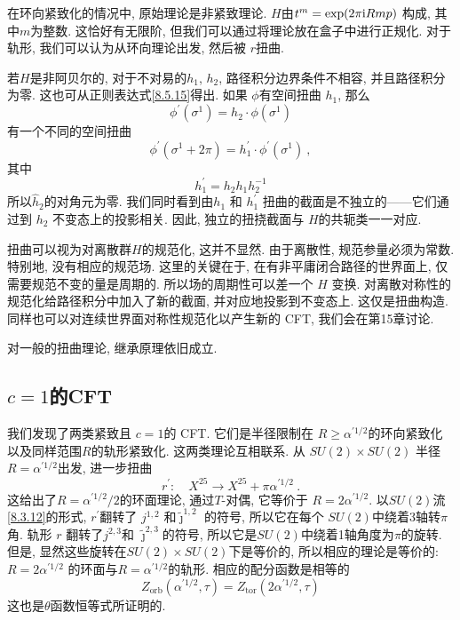 在环向紧致化的情况中, 原始理论是非紧致理论.  $H$由$t^{m}=\exp (2 \pi \mathrm{i} R m p)$ 构成, 其中$m$为整数. 这恰好有无限阶, 但我们可以通过将理论放在盒子中进行正规化. 对于轨形, 我们可以认为从环向理论出发, 然后被 $r$扭曲.

若$H$是非阿贝尔的, 对于不对易的$h_{1}$,  $h_{2}$, 路径积分边界条件不相容, 并且路径积分为零. 这也可从正则表达式\eqref{8.5.15}得出. 如果 $\phi$有空间扭曲 $h_{1}$, 那么
\begin{equation}
	\phi^{\prime}(\sigma^{1})=h_{2} \cdot \phi(\sigma^{1}) \label{8.5.17}
\end{equation}
有一个不同的空间扭曲
\begin{equation}
	\phi^{\prime}(\sigma^{1}+2 \pi)=h_{1}^{\prime} \cdot \phi^{\prime}(\sigma^{1}) \:, \label{8.5.18}
\end{equation}
其中
\begin{equation}
	h_{1}^{\prime}=h_{2} h_{1} h_{2}^{-1} \label{8.5.19}
\end{equation}
所以$\hat{h}_{2}$的对角元为零. 我们同时看到由$h_{1}$ 和 $h_{1}^{\prime}$ 扭曲的截面是不独立的——它们通过到 $h_{2}$ 不变态上的投影相关. 因此, 独立的扭挠截面与 $H$的共轭类一一对应.

扭曲可以视为对离散群$H$的规范化, 这并不显然. 由于离散性, 规范参量必须为常数. 特别地, 没有相应的规范场. 这里的关键在于, 在有非平庸闭合路径的世界面上, 仅需要规范不变的量是周期的. 所以场的周期性可以差一个 $H$ 变换. 对离散对称性的规范化给路径积分中加入了新的截面, 并对应地投影到不变态上. 这仅是扭曲构造. 同样也可以对连续世界面对称性规范化以产生新的 CFT, 我们会在第15章讨论.

对一般的扭曲理论, 继承原理依旧成立.

\subsection*{$c=1$的CFT}	

我们发现了两类紧致且 $c=1$的 CFT. 它们是半径限制在 $R \geq \alpha^{\prime 1/2}$的环向紧致化以及同样范围$R$的轨形紧致化. 
这两类理论互相联系. 从 $S U(2) \times S U(2)$ 半径 $R=\alpha^{\prime 1/2}$出发, 进一步扭曲
\begin{equation}
	r^{\prime}: \quad X^{25} \rightarrow X^{25}+\pi \alpha^{\prime 1/2} \:. \label{8.5.20} 
\end{equation}
这给出了$R=\alpha^{\prime 1/2}/2$的环面理论, 通过$T$-对偶, 它等价于 $R=2 \alpha^{\prime 1/2}$. 
以$SU(2)$流 \eqref{8.3.12}的形式,  $r^{\prime}$翻转了 $j^{1,2}$ 和$\tilde{\jmath}^{1,2}$ 的符号, 
所以它在每个 $S U(2) $中绕着3轴转$\pi$ 角. 轨形 $r$ 翻转了$j^{2,3}$和 $\tilde{\jmath}^{2,3}$的符号, 
所以它是$SU(2)$中绕着1轴角度为$\pi$的旋转. 但是, 显然这些旋转在$S U(2) \times S U(2)$下是等价的, 所以相应的理论是等价的: 
$R=2 \alpha^{\prime 1/2}$ 的环面与$R=\alpha^{\prime 1/2}$的轨形. 相应的配分函数是相等的
\begin{equation}
	Z_{\text{orb}}(\alpha^{\prime 1/2}, \tau)=Z_{\text{tor}}(2 \alpha^{\prime 1/2}, \tau) \label{8.5.21}
\end{equation}
这也是$\theta$函数恒等式所证明的.

